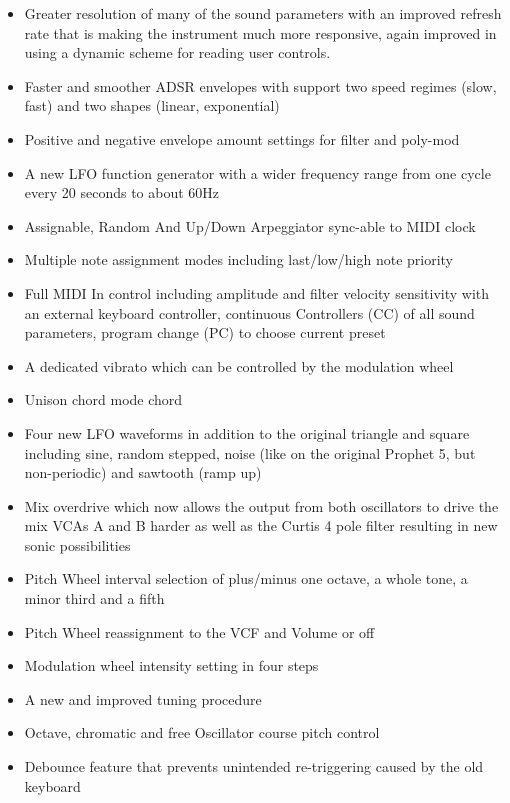 \documentclass[landscape, 11pt, oneside]{report}
\newenvironment{flowtext}{\addmargin[0cm]{7cm}}{\endaddmargin} %
\begin{document}
\begin{flowtext}
\begin{itemize}
  \setlength\itemsep{0cm}
  \item Greater resolution of many of the sound parameters with an improved refresh rate that is making the instrument much more responsive, again improved in \version using a dynamic scheme for reading user controls.
  \item Faster and smoother ADSR envelopes with support two speed regimes (slow, fast) and two shapes (linear, exponential)
  \item Positive and negative envelope amount settings for filter and poly-mod 
  \item A new LFO function generator with a wider frequency range from one cycle every 20 seconds to about 60Hz
  \item Assignable, Random And Up/Down Arpeggiator sync-able to MIDI clock
  \item Multiple note assignment modes including last/low/high note priority
  \item Full MIDI In control including amplitude and filter velocity sensitivity with an external keyboard controller, continuous Controllers (CC) of all sound parameters, program change (PC) to choose current preset
  \item A dedicated vibrato which can be controlled by the modulation wheel
  \item Unison chord mode chord
  \item Four new LFO waveforms in addition to the original triangle and square including sine, random stepped, noise (like on the original Prophet 5, but non-periodic) and sawtooth (ramp up)
  \item Mix overdrive which now allows the output from both oscillators to drive the mix VCAs A and B harder as well as the Curtis 4 pole filter resulting in new sonic possibilities
  \item Pitch Wheel interval selection of plus/minus one octave, a whole tone, a minor third and a fifth
  \item Pitch Wheel reassignment to the VCF and Volume or off   
  \item Modulation wheel intensity setting in four steps
  \item A new and improved tuning procedure
  \item Octave, chromatic and free Oscillator course pitch control
  \item Debounce feature that prevents unintended re-triggering caused by the old keyboard
\end{itemize}


\end{flowtext}
\end{document}
